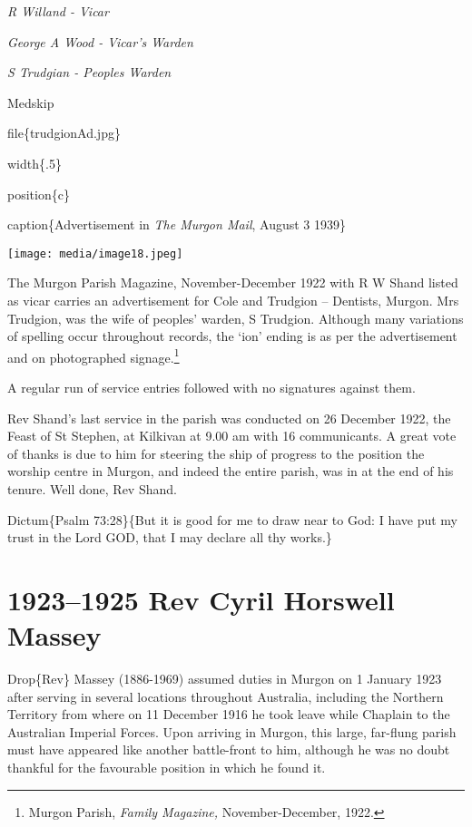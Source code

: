 \emph{R Willand - Vicar}

\emph{George A Wood - Vicar's Warden}

\emph{S Trudgian - Peoples Warden}

Medskip

file\{trudgionAd.jpg\}

width\{.5\}

position\{c\}

caption\{Advertisement in \emph{The Murgon Mail}, August 3 1939\}

\texttt{[image: media/image18.jpeg]}

The Murgon Parish Magazine, November-December 1922 with R W Shand listed as vicar carries an advertisement for Cole and Trudgion -- Dentists, Murgon. Mrs Trudgion, was the wife of peoples' warden, S Trudgion. Although many variations of spelling occur throughout records, the `ion' ending is as per the advertisement and on photographed signage.\footnote{Murgon Parish, \emph{Family Magazine,} November-December, 1922.}

A regular run of service entries followed with no signatures against them.

Rev Shand's last service in the parish was conducted on 26 December 1922, the Feast of St Stephen, at Kilkivan at 9.00 am with 16 communicants. A great vote of thanks is due to him for steering the ship of progress to the position the worship centre in Murgon, and indeed the entire parish, was in at the end of his tenure. Well done, Rev Shand.

\begin{quote}
\end{quote}

Dictum\{Psalm 73:28\}\{But it is good for me to draw near to God: I have put my trust in the Lord GOD, that I may declare all thy works.\}

\hypertarget{rev-cyril-horswell-massey}{%
\chapter{1923--1925 Rev Cyril Horswell Massey}\label{rev-cyril-horswell-massey}}

Drop\{Rev\} Massey (1886-1969) assumed duties in Murgon on 1 January 1923 after serving in several locations throughout Australia, including the Northern Territory from where on 11 December 1916 he took leave while Chaplain to the Australian Imperial Forces. Upon arriving in Murgon, this large, far-flung parish must have appeared like another battle-front to him, although he was no doubt thankful for the favourable position in which he found it.

